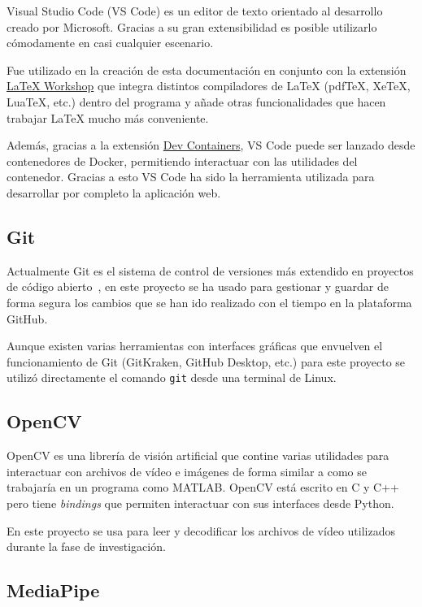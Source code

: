 Visual Studio Code (VS Code) es un editor de texto orientado al desarrollo
creado por Microsoft. Gracias a su gran extensibilidad es posible utilizarlo
cómodamente en casi cualquier escenario.

Fue utilizado en la creación de esta documentación en conjunto con la extensión
\href{https://github.com/James-Yu/LaTeX-Workshop}{\LaTeX{} Workshop} que integra
distintos compiladores de \LaTeX{} (pdfTeX, XeTeX, LuaTeX, etc.) dentro del
programa y añade otras funcionalidades que hacen trabajar \LaTeX{} mucho más
conveniente.

Además, gracias a la extensión
\href{https://marketplace.visualstudio.com/items?itemName=ms-vscode-remote.remote-containers}{Dev
Containers}, VS Code puede ser lanzado desde contenedores de Docker, permitiendo
interactuar con las utilidades del contenedor. Gracias a esto VS Code ha sido la
herramienta utilizada para desarrollar por completo la aplicación web.

\subsection{Git}

Actualmente Git es el sistema de control de versiones más extendido en proyectos
de código abierto~\cite{OpenHubVCS}, en este proyecto se ha usado para gestionar
y guardar de forma segura los cambios que se han ido realizado con el tiempo en
la plataforma GitHub.

Aunque existen varias herramientas con interfaces gráficas que envuelven el
funcionamiento de Git (GitKraken, GitHub Desktop, etc.) para este proyecto se
utilizó directamente el comando \texttt{git} desde una terminal de Linux.

\subsection{OpenCV}

OpenCV es una librería de visión artificial que contine varias utilidades para
interactuar con archivos de vídeo e imágenes de forma similar a como se
trabajaría en un programa como MATLAB\@. OpenCV está escrito en C y C++ pero tiene
\textit{bindings} que permiten interactuar con sus interfaces desde Python.

En este proyecto se usa para leer y decodificar los archivos de vídeo utilizados
durante la fase de investigación.

\subsection{MediaPipe}


